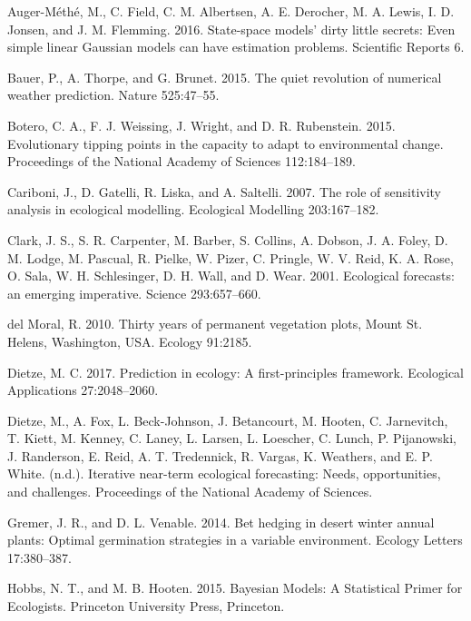 \documentclass[12pt,]{article}
\begin{document}
\hypertarget{refs}{}
\leavevmode\hypertarget{ref-Auger-Methe2016}{}%
Auger-Méthé, M., C. Field, C. M. Albertsen, A. E. Derocher, M. A. Lewis,
I. D. Jonsen, and J. M. Flemming. 2016. State-space models' dirty little
secrets: Even simple linear Gaussian models can have estimation
problems. Scientific Reports 6.

\leavevmode\hypertarget{ref-Bauer2015}{}%
Bauer, P., A. Thorpe, and G. Brunet. 2015. The quiet revolution of
numerical weather prediction. Nature 525:47--55.

\leavevmode\hypertarget{ref-Botero2015}{}%
Botero, C. A., F. J. Weissing, J. Wright, and D. R. Rubenstein. 2015.
Evolutionary tipping points in the capacity to adapt to environmental
change. Proceedings of the National Academy of Sciences 112:184--189.

\leavevmode\hypertarget{ref-Cariboni2007}{}%
Cariboni, J., D. Gatelli, R. Liska, and A. Saltelli. 2007. The role of
sensitivity analysis in ecological modelling. Ecological Modelling
203:167--182.

\leavevmode\hypertarget{ref-Clark2001}{}%
Clark, J. S., S. R. Carpenter, M. Barber, S. Collins, A. Dobson, J. A.
Foley, D. M. Lodge, M. Pascual, R. Pielke, W. Pizer, C. Pringle, W. V.
Reid, K. A. Rose, O. Sala, W. H. Schlesinger, D. H. Wall, and D. Wear.
2001. Ecological forecasts: an emerging imperative. Science
293:657--660.

\leavevmode\hypertarget{ref-DelMoral2010}{}%
del Moral, R. 2010. Thirty years of permanent vegetation plots, Mount
St. Helens, Washington, USA. Ecology 91:2185.

\leavevmode\hypertarget{ref-Dietze2017a}{}%
Dietze, M. C. 2017. Prediction in ecology: A first-principles framework.
Ecological Applications 27:2048--2060.

\leavevmode\hypertarget{ref-Dietze2018}{}%
Dietze, M., A. Fox, L. Beck-Johnson, J. Betancourt, M. Hooten, C.
Jarnevitch, T. Kiett, M. Kenney, C. Laney, L. Larsen, L. Loescher, C.
Lunch, P. Pijanowski, J. Randerson, E. Reid, A. T. Tredennick, R.
Vargas, K. Weathers, and E. P. White. (n.d.). Iterative near-term
ecological forecasting: Needs, opportunities, and challenges.
Proceedings of the National Academy of Sciences.

\leavevmode\hypertarget{ref-Gremer2014}{}%
Gremer, J. R., and D. L. Venable. 2014. Bet hedging in desert winter
annual plants: Optimal germination strategies in a variable environment.
Ecology Letters 17:380--387.

\leavevmode\hypertarget{ref-Hobbs2015}{}%
Hobbs, N. T., and M. B. Hooten. 2015. Bayesian Models: A Statistical
Primer for Ecologists. Princeton University Press, Princeton.
\end{document}
